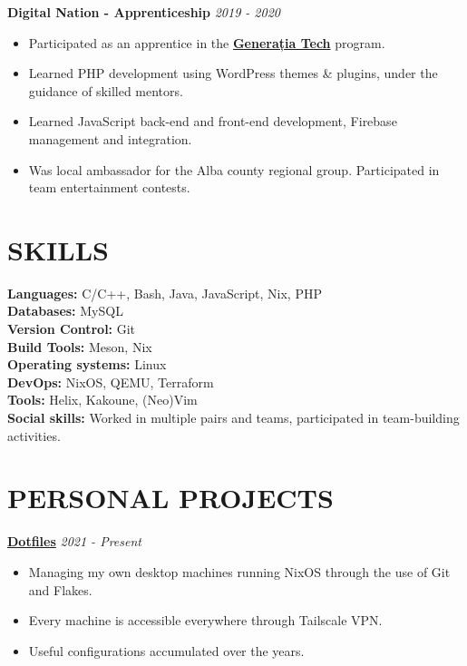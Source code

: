 \documentclass[margin]{res}
\begin{document}
\begin{resume}
  {\bf Digital Nation - Apprenticeship} \hfill \textit{2019 - 2020}\\
  \begin{itemize}
    \item Participated as an apprentice in the \href{https://generatiatech.ro}{\textbf{Generația Tech}} program.
    \item Learned PHP development using WordPress themes \& plugins, under the guidance of skilled mentors.
    \item Learned JavaScript back-end and front-end development, Firebase management and integration.
    \item Was local ambassador for the Alba county regional group. Participated in team entertainment contests.
  \end{itemize}

  \section{SKILLS}
  {\bf Languages:} C/C++, Bash, Java, JavaScript, Nix, PHP\\
  {\bf Databases:} MySQL\\
  {\bf Version Control:} Git\\
  {\bf Build Tools:} Meson, Nix\\
  {\bf Operating systems:} Linux\\
  {\bf DevOps:} NixOS, QEMU, Terraform\\
  {\bf Tools:} Helix, Kakoune, (Neo)Vim\\

  {\bf Social skills:} Worked in multiple pairs and teams, participated in team-building activities.

  \section{PERSONAL PROJECTS}

  {\bf \href{https://github.com/fufexan/dotfiles}{Dotfiles}} \hfill \textit{2021 - Present}\\
  \begin{itemize}
    \item Managing my own desktop machines running NixOS through the use of Git and Flakes.
    \item Every machine is accessible everywhere through Tailscale VPN.
    \item Useful configurations accumulated over the years.
  \end{itemize}



\end{resume}
\end{document}
